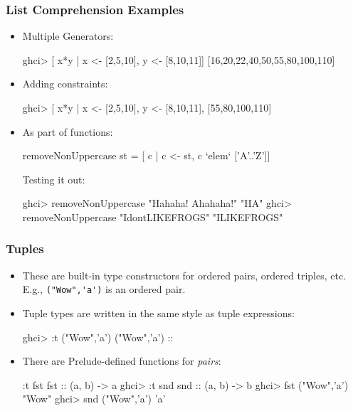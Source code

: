 \documentclass{beamer}
\newenvironment{codeblock}[1][.8]{%
\begin{columns}
\begin{column}{#1\linewidth}
\begin{exampleblock}{}}{%
\end{exampleblock}
\end{column}
\end{columns}}
\begin{document}

\begin{frame}[fragile]
\frametitle{List Comprehension Examples}

\begin{itemize}

\item Multiple Generators:
\begin{hcode}
ghci> [ x*y | x <- [2,5,10], y <- [8,10,11]]  
[16,20,22,40,50,55,80,100,110]   
\end{hcode}

\pause
\item Adding constraints:
\begin{tinycode}
ghci> [ x*y | x <- [2,5,10], y <- [8,10,11], %
[55,80,100,110]    
\end{tinycode}

\pause
\item As part of functions:
\begin{tinycode}
removeNonUppercase st = [ c | c <- st, c `elem` ['A'..'Z']]   
\end{tinycode}
Testing it out:
\begin{hcode}
ghci> removeNonUppercase "Hahaha! Ahahaha!"  
"HA"  
ghci> removeNonUppercase "IdontLIKEFROGS"  
"ILIKEFROGS"   
\end{hcode}

\end{itemize}

\end{frame}


\begin{frame}[fragile]
\frametitle{Tuples}

%

\begin{itemize}

\item These are built-in type constructors for ordered pairs, ordered triples, etc. E.g., \verb+("Wow",'a')+ is an ordered pair.
\pause

\item Tuple types are written in the same style as tuple expressions:
\begin{hcode}
ghci> :t ("Wow",'a')
("Wow",'a') :: %
\end{hcode}
\pause
\item There are Prelude-defined functions for \emph{pairs}:
\begin{hcode}
:t fst
fst :: (a, b) -> a
ghci> :t snd
snd :: (a, b) -> b
ghci> fst ("Wow",'a')
"Wow"
ghci> snd ("Wow",'a')
'a'
\end{hcode}


\end{itemize}

\end{frame}
\end{document}
